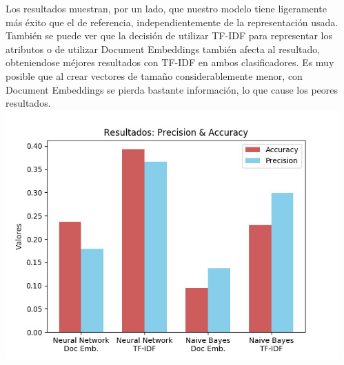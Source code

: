 \documentclass[25pt,landscape]{tikzposter}
\begin{document}
\begin{columns}
{    	\paragraph{}Los resultados muestran, por un lado, que nuestro modelo tiene ligeramente más éxito que el de referencia, independientemente de la representación usada. También se puede ver que la decisión de utilizar TF-IDF para representar los atributos o de utilizar Document Embeddings también afecta al resultado, obteniendose méjores resultados con TF-IDF en ambos clasificadores. Es muy posible que al crear vectores de tamaño considerablemente menor, con Document Embeddings se pierda bastante información, lo que cause los peores resultados.
		\includegraphics[scale=2]{img/PrecisionAccuracy.jpeg}
    }
    
\end{columns}
 	
\end{document}
